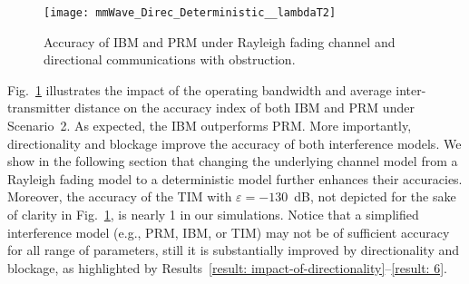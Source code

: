\documentclass[12pt, draftclsnofoot, onecolumn]{IEEEtran}
\begin{document}
\begin{figure}[!t]
  \centering
  \texttt{[image: mmWave\_Direc\_Deterministic\_\_lambdaT2]}

  \caption{Accuracy of IBM and PRM under Rayleigh fading channel and directional communications with obstruction.}
  \label{mmWave_Direc_Deterministic__lambdaT2}
\vspace{-7mm}
\end{figure}
Fig.~\ref{mmWave_Direc_Deterministic__lambdaT2} illustrates the impact of the operating bandwidth and average inter-transmitter distance on the accuracy index of both IBM and PRM under Scenario~2. As expected, the IBM outperforms PRM. More importantly, directionality and blockage improve the accuracy of both interference models. We show in the following section that changing the underlying channel model from a Rayleigh fading model to a deterministic model further enhances their accuracies. Moreover, the accuracy of the TIM with ${\varepsilon = -130}$~dB, not depicted for the sake of clarity in Fig.~\ref{mmWave_Direc_Deterministic__lambdaT2}, is nearly 1 in our simulations. Notice that a simplified interference model (e.g., PRM, IBM, or TIM) may not be of sufficient accuracy for all range of parameters, still it is substantially improved by directionality and blockage, as highlighted by Results~\ref{result: impact-of-directionality}--\ref{result: 6}.

%

%
\end{document}
